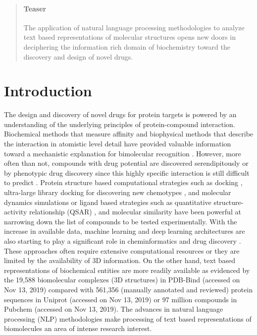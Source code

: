 \documentclass[review]{elsarticle}
\begin{document}
\begin{frontmatter}
\begin{abstract}
\paragraph{Teaser} The application of natural language processing methodologies to analyze text based representations of molecular structures opens new doors in deciphering the information rich domain of biochemistry toward the discovery and design of novel drugs. 

\end{abstract}



\end{frontmatter}




\section{Introduction}

The design and discovery of novel drugs for protein targets is powered by an understanding of the underlying principles of protein-compound interaction. Biochemical methods that measure affinity and biophysical methods that describe the interaction in atomistic level detail have provided valuable information toward a mechanistic explanation for bimolecular recognition \cite{schneider2018automating}. However, more often than not, compounds with drug potential are discovered serendipitously or by phenotypic drug discovery \cite{moffat2017opportunities} since this highly specific interaction is still difficult to predict \cite{duarte2019integration}. Protein structure based computational strategies such as docking \cite{sledz2018protein},  ultra-large library docking for discovering new chemotypes \cite{lyu2019ultra}, and molecular dynamics simulations \cite{sledz2018protein} or ligand based strategies such as quantitative structure-activity relationship (QSAR) \cite{schneider2016novo, bosc2019large}, and molecular similarity \cite{eckert2007molecular} have been powerful at narrowing down the list of compounds to be tested experimentally. With the increase in available data, machine learning and deep learning architectures are also starting to play a significant role in cheminformatics and drug discovery \cite{lo2018machine}. These approaches often require extensive computational resources or they are limited by the availability of 3D information. On the other hand, text based representations of biochemical entities are more readily available as evidenced by the 19,588 biomolecular complexes (3D structures) in PDB-Bind \cite{wang2005pdbbind} (accessed on Nov 13, 2019) compared with 561,356 (manually annotated and reviewed) protein sequences in Uniprot \cite{apweiler2004uniprot} (accessed on Nov 13, 2019) or 97 million compounds in Pubchem \cite{bolton2008pubchem} (accessed on Nov 13, 2019). The advances in natural language processing (NLP) methodologies make processing of text based representations of biomolecules an area of intense research interest.
\end{document}
